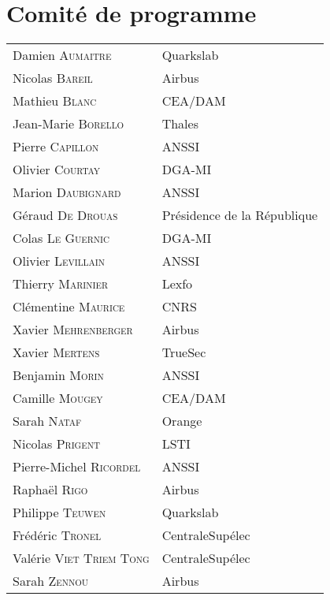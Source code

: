 \section*{Comité de programme}
\begin{tabular}{@{}p{5cm}@{}p{6.5cm}@{}}
  Damien \textsc{Aumaitre}        & Quarkslab           \\
  Nicolas  \textsc{Bareil}        & Airbus              \\
  Mathieu \textsc{Blanc}          & CEA/DAM             \\
  Jean-Marie \textsc{Borello}     & Thales              \\
  Pierre   \textsc{Capillon}      & ANSSI               \\
  Olivier \textsc{Courtay}        & DGA-MI              \\
  Marion \textsc{Daubignard}      & ANSSI               \\
  Géraud \textsc{De Drouas}       & Présidence de la République \\
  Colas \textsc{Le Guernic}       & DGA-MI              \\
  Olivier \textsc{Levillain}      & ANSSI               \\
  Thierry \textsc{Marinier}       & Lexfo               \\
  Clémentine \textsc{Maurice}     & CNRS                \\
  Xavier \textsc{Mehrenberger}    & Airbus              \\
  Xavier \textsc{Mertens}         & TrueSec             \\
  Benjamin \textsc{Morin}         & ANSSI               \\
  Camille \textsc{Mougey}         & CEA/DAM             \\
  Sarah \textsc{Nataf}            & Orange              \\
  Nicolas \textsc{Prigent}        & LSTI                \\
  Pierre-Michel \textsc{Ricordel} & ANSSI               \\
  Raphaël \textsc{Rigo}           & Airbus              \\
  Philippe \textsc{Teuwen}        & Quarkslab           \\
  Frédéric \textsc{Tronel}        & CentraleSupélec     \\
  Valérie \textsc{Viet Triem Tong}& CentraleSupélec     \\
  Sarah \textsc{Zennou}           & Airbus              \\
\end{tabular}
